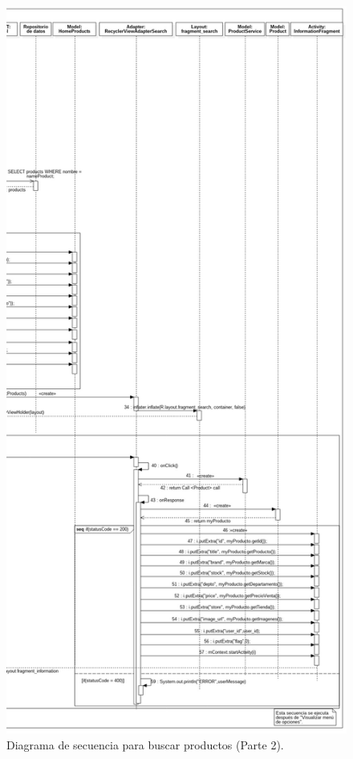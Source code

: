 \FloatBarrier
\begin{figure}[htbp!]
		\centering
			\includegraphics[width=.6 \textwidth]{imagenes/Diagramas_UserApp/Nuevos_diagramas/buscarPoductos2}
		\caption{Diagrama de secuencia para buscar productos (Parte 2).}
		\label{image:busca3}
\end{figure}
\FloatBarrier

